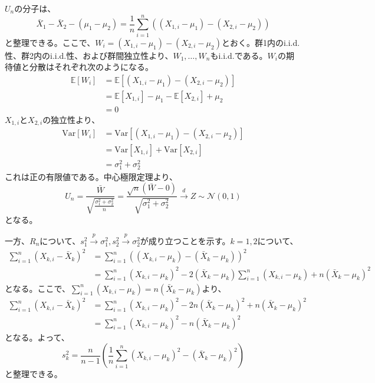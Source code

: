 $U_{n}$の分子は、
\begin{equation}
    \bar{X}_1 - \bar{X}_2 - (\mu_1 - \mu_2) = \frac{1}{n} \sum_{i = 1}^{n} ((X_{1, i} - \mu_{1}) - (X_{2, i} - \mu_{2}))
\end{equation}
と整理できる。ここで、$W_{i} = (X_{1, i} - \mu_{1}) - (X_{2, i} - \mu_{2})$とおく。群1内のi.i.d.性、群2内のi.i.d.性、および群間独立性より、$W_{1}, \ldots, W_{n}$もi.i.d.である。$W_{i}$の期待値と分散はそれぞれ次のようになる。
\begin{align}
    \mathbb{E}[W_{i}] & = \mathbb{E}[(X_{1, i} - \mu_{1}) - (X_{2, i} - \mu_{2})]         \\
                      & = \mathbb{E}[X_{1, i}] - \mu_{1} - \mathbb{E}[X_{2, i}] + \mu_{2} \\
                      & = 0
\end{align}
$X_{1, i}$と$X_{2, i}$の独立性より、
\begin{align}
    \text{Var}[W_{i}] & = \text{Var}[(X_{1, i} - \mu_{1}) - (X_{2, i} - \mu_{2})] \\
                      & = \text{Var}[X_{1, i}] + \text{Var}[X_{2, i}]             \\
                      & = \sigma_{1}^{2} + \sigma_{2}^{2}
\end{align}
これは正の有限値である。中心極限定理より、
\begin{equation}
    U_{n} = \frac{\bar{W}}{\sqrt{\frac{\sigma_{1}^{2} + \sigma_{2}^{2}}{n}}} = \frac{\sqrt{n}(\bar{W} - 0)}{\sqrt{\sigma_{1}^{2} + \sigma_{2}^{2}}} \xrightarrow{d} Z \sim \mathcal{N}(0, 1)
\end{equation}
となる。

一方、$R_{n}$について、$s_{1}^{2} \xrightarrow{p} \sigma_{1}^{2}, s_{2}^{2} \xrightarrow{p} \sigma_{2}^{2}$が成り立つことを示す。$k = 1, 2$について、
\begin{align}
    \sum_{i = 1}^{n} (X_{k, i} - \bar{X}_{k})^{2}
     & = \sum_{i = 1}^{n} ((X_{k, i} - \mu_{k}) - (\bar{X}_{k} - \mu_{k}))^{2}                                                                     \\
     & = \sum_{i = 1}^{n} (X_{k, i} - \mu_{k})^{2} - 2(\bar{X}_{k} - \mu_{k}) \sum_{i = 1}^{n} (X_{k, i} - \mu_{k}) + n(\bar{X}_{k} - \mu_{k})^{2}
\end{align}
となる。ここで、$\sum_{i = 1}^{n} (X_{k, i} - \mu_{k}) = n(\bar{X}_{k} - \mu_{k})$より、
\begin{align}
    \sum_{i = 1}^{n} (X_{k, i} - \bar{X}_{k})^{2}
     & = \sum_{i = 1}^{n} (X_{k, i} - \mu_{k})^{2} - 2n(\bar{X}_{k} - \mu_{k})^{2} + n(\bar{X}_{k} - \mu_{k})^{2} \\
     & = \sum_{i = 1}^{n} (X_{k, i} - \mu_{k})^{2} - n(\bar{X}_{k} - \mu_{k})^{2}
\end{align}
となる。よって、
\begin{equation}
    s_{k}^{2} = \frac{n}{n - 1} \left(\frac{1}{n} \sum_{i = 1}^{n} (X_{k, i} - \mu_{k})^{2} - (\bar{X}_{k} - \mu_{k})^{2}\right)
\end{equation}
と整理できる。

